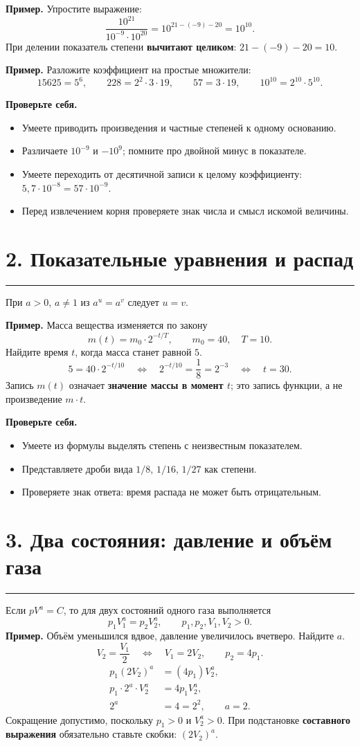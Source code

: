 \documentclass[a4paper,12pt]{article}
\newcommand{\sectionline}{\par\vspace{2pt}\noindent\textcolor{accent}{\rule{\linewidth}{0.5pt}}\par\vspace{3pt}}
\newcommand{\focus}[1]{\textbf{\textcolor{darkaccent}{#1}}}
\newcommand{\checklist}[1]{\par\smallskip\textcolor{darkaccent}{\textbf{Проверьте себя.}}\par\begin{itemize}[label=$\square$]#1\end{itemize}}
\begin{document}
\textbf{Пример.} Упростите выражение:
\[
\frac{10^{21}}{10^{-9}\cdot10^{20}}
=10^{21-(-9)-20}=10^{10}.
\]
При делении показатель степени \focus{вычитают целиком}: \(21-(-9)-20=10\).

\textbf{Пример.} Разложите коэффициент на простые множители:
\[
15625=5^6,\qquad 228=2^2\cdot3\cdot19,\qquad 57=3\cdot19,
\qquad 10^{10}=2^{10}\cdot5^{10}.
\]

\checklist{
\item Умеете приводить произведения и частные степеней к одному основанию.
\item Различаете \(10^{-9}\) и \(-10^9\); помните про двойной минус в показателе.
\item Умеете переходить от десятичной записи к целому коэффициенту: \(5{,}7\cdot10^{-8}=57\cdot10^{-9}\).
\item Перед извлечением корня проверяете знак числа и смысл искомой величины.
}

\section*{2. Показательные уравнения и распад}
\sectionline
При \(a>0\), \(a\ne 1\) из \(a^u=a^v\) следует \(u=v\).

\textbf{Пример.} Масса вещества изменяется по закону
\[
m(t)=m_0\cdot 2^{-t/T},\qquad m_0=40,\quad T=10.
\]
Найдите время \(t\), когда масса станет равной \(5\).
\[
5=40\cdot2^{-t/10}\quad\Longleftrightarrow\quad
2^{-t/10}=\frac18=2^{-3}\quad\Longleftrightarrow\quad
t=30.
\]
Запись \(m(t)\) означает \focus{значение массы в момент \(t\)}; это запись функции, а не произведение \(m\cdot t\).

\checklist{
\item Умеете из формулы выделять степень с неизвестным показателем.
\item Представляете дроби вида \(1/8\), \(1/16\), \(1/27\) как степени.
\item Проверяете знак ответа: время распада не может быть отрицательным.
}

\section*{3. Два состояния: давление и объём газа}
\sectionline
Если \(pV^a=C\), то для двух состояний одного газа выполняется
\[
p_1V_1^a=p_2V_2^a,\qquad p_1,p_2,V_1,V_2>0.
\]
\textbf{Пример.} Объём уменьшился вдвое, давление увеличилось вчетверо. Найдите \(a\).
\[
V_2=\frac{V_1}{2}\quad\Longleftrightarrow\quad V_1=2V_2,
\qquad p_2=4p_1.
\]
\[
\begin{aligned}
p_1(2V_2)^a&=(4p_1)V_2^a,\\
p_1\cdot2^a\cdot V_2^a&=4p_1V_2^a,\\
2^a&=4=2^2,\qquad \boxed{a=2}.
\end{aligned}
\]
Сокращение допустимо, поскольку \(p_1>0\) и \(V_2^a>0\). При подстановке \focus{составного выражения} обязательно ставьте скобки: \((2V_2)^a\).
\end{document}
